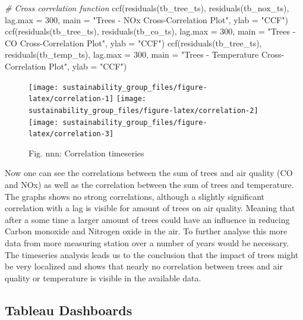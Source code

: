 \documentclass[
]{article}
\newenvironment{Shaded}{\begin{snugshade}}{\end{snugshade}}
\newcommand{\AttributeTok}[1]{\textcolor[rgb]{0.77,0.63,0.00}{#1}}
\newcommand{\CommentTok}[1]{\textcolor[rgb]{0.56,0.35,0.01}{\textit{#1}}}
\newcommand{\DecValTok}[1]{\textcolor[rgb]{0.00,0.00,0.81}{#1}}
\newcommand{\FunctionTok}[1]{\textcolor[rgb]{0.00,0.00,0.00}{#1}}
\newcommand{\NormalTok}[1]{#1}
\newcommand{\StringTok}[1]{\textcolor[rgb]{0.31,0.60,0.02}{#1}}
\begin{document}
\begin{Shaded}
\begin{Highlighting}[]
\CommentTok{\# Cross correlation function}
\FunctionTok{ccf}\NormalTok{(}\FunctionTok{residuals}\NormalTok{(tb\_tree\_ts), }\FunctionTok{residuals}\NormalTok{(tb\_nox\_ts), }
    \AttributeTok{lag.max =} \DecValTok{300}\NormalTok{,}
    \AttributeTok{main =} \StringTok{"Trees {-} NOx Cross{-}Correlation Plot"}\NormalTok{,}
    \AttributeTok{ylab =} \StringTok{"CCF"}\NormalTok{)}
\FunctionTok{ccf}\NormalTok{(}\FunctionTok{residuals}\NormalTok{(tb\_tree\_ts), }\FunctionTok{residuals}\NormalTok{(tb\_co\_ts), }
    \AttributeTok{lag.max =} \DecValTok{300}\NormalTok{,}
    \AttributeTok{main =} \StringTok{"Trees {-} CO Cross{-}Correlation Plot"}\NormalTok{,}
    \AttributeTok{ylab =} \StringTok{"CCF"}\NormalTok{)}
\FunctionTok{ccf}\NormalTok{(}\FunctionTok{residuals}\NormalTok{(tb\_tree\_ts), }\FunctionTok{residuals}\NormalTok{(tb\_temp\_ts), }
    \AttributeTok{lag.max =} \DecValTok{300}\NormalTok{,}
    \AttributeTok{main =} \StringTok{"Trees {-} Temperature Cross{-}Correlation Plot"}\NormalTok{,}
    \AttributeTok{ylab =} \StringTok{"CCF"}\NormalTok{)}
\end{Highlighting}
\end{Shaded}

\begin{figure}
\texttt{[image: sustainability\_group\_files/figure-latex/correlation-1]} \texttt{[image: sustainability\_group\_files/figure-latex/correlation-2]} \texttt{[image: sustainability\_group\_files/figure-latex/correlation-3]} \caption{Fig. nnn: Correlation timeseries}\label{fig:correlation}
\end{figure}

Now one can see the correlations between the sum of trees and air
quality (CO and NOx) as well as the correlation between the sum of trees
and temperature. The graphs shows no strong correlations, although a
slightly significant correlation with a lag is visible for amount of
trees on air quality. Meaning that after a some time a larger amount of
trees could have an influence in reducing Carbon monoxide and Nitrogen
oxide in the air. To further analyse this more data from more measuring
station over a number of years would be necessary. The timeseries
analysis leads us to the conclusion that the impact of trees might be
very localized and shows that nearly no correlation between trees and
air quality or temperature is visible in the available data.

\hypertarget{tableau-dashboards}{%
\subsection{Tableau Dashboards}\label{tableau-dashboards}}
\end{document}
